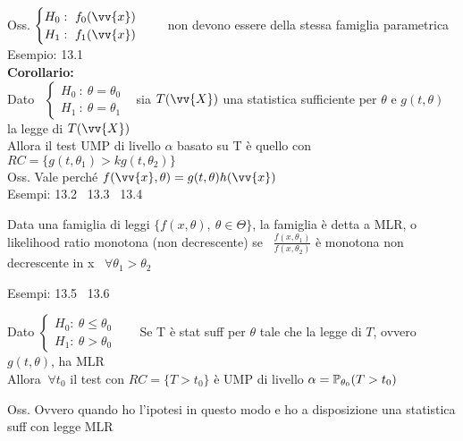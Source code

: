 
Oss.
$\begin{cases}
    H_0 : \ f_0(\vv{x})\\
    H_1 : \ f_1(\vv{x})
\end{cases}$ \ \ non devono essere della stessa famiglia parametrica\\

Esempio: 13.1\\

\textbf{Corollario:}\\
Dato \ $\begin{cases}
    H_0 \ : \ \theta=\theta_0\\
    H_1 \ : \ \theta=\theta_1
\end{cases}$ \ sia $T(\vv{X})$ una statistica sufficiente per $\theta$ e $g(t,\theta)$ la legge di $T(\vv{X})$\\
Allora il test UMP di livello $\alpha$ basato su T è quello con $RC=\{g(t,\theta_1)>kg(t,\theta_2)\}$\\

Oss. Vale perché $f(\vv{x},\theta)=g(t,\theta)h(\vv{x})$\\

Esempi: 13.2 \ 13.3 \ 13.4\\


\begin{defi}
    Data una famiglia di leggi $\{f(x,\theta), \ \theta\in \Theta\}$, la famiglia è detta a MLR, o likelihood ratio monotona (non decrescente)  se \ $\frac{f(x,\theta_1)}{f(x,\theta_2)}$ è monotona non decrescente in x \ $\forall\theta_1>\theta_2$
\end{defi}

\phantom{}

Esempi: 13.5 \ 13.6\\


\begin{teo}
    Dato $\begin{cases}
        H_0 : \ \theta\le \theta_0\\
        H_1 : \ \theta> \theta_0
    \end{cases}$
    \ \  \ Se T è stat suff per $\theta$ tale che la legge di $T$, ovvero $g(t,\theta)$, ha MLR\\
    Allora $\ \forall t_0$ il test con $RC= \{ T>t_0 \}$ è UMP di livello $\alpha = \mathbb P_{\theta_0}(T>t_0)$ 
\end{teo}

Oss. Ovvero quando ho l'ipotesi in questo modo e ho a disposizione una statistica suff con legge MLR\\



